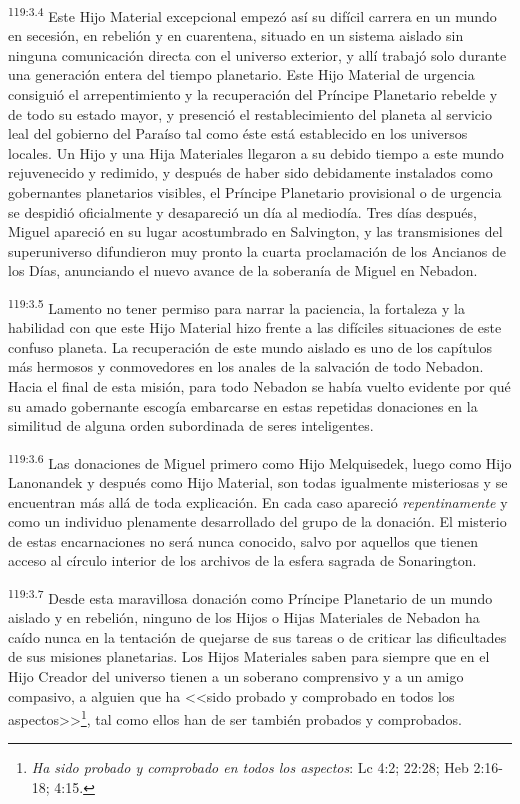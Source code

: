 \par
\textsuperscript{119:3.4} Este Hijo Material excepcional empezó así su difícil carrera en un mundo en secesión, en rebelión y en cuarentena, situado en un sistema aislado sin ninguna comunicación directa con el universo exterior, y allí trabajó solo durante una generación entera del tiempo planetario. Este Hijo Material de urgencia consiguió el arrepentimiento y la recuperación del Príncipe Planetario rebelde y de todo su estado mayor, y presenció el restablecimiento del planeta al servicio leal del gobierno del Paraíso tal como éste está establecido en los universos locales. Un Hijo y una Hija Materiales llegaron a su debido tiempo a este mundo rejuvenecido y redimido, y después de haber sido debidamente instalados como gobernantes planetarios visibles, el Príncipe Planetario provisional o de urgencia se despidió oficialmente y desapareció un día al mediodía. Tres días después, Miguel apareció en su lugar acostumbrado en Salvington, y las transmisiones del superuniverso difundieron muy pronto la cuarta proclamación de los Ancianos de los Días, anunciando el nuevo avance de la soberanía de Miguel en Nebadon.

\par
\textsuperscript{119:3.5} Lamento no tener permiso para narrar la paciencia, la fortaleza y la habilidad con que este Hijo Material hizo frente a las difíciles situaciones de este confuso planeta. La recuperación de este mundo aislado es uno de los capítulos más hermosos y conmovedores en los anales de la salvación de todo Nebadon. Hacia el final de esta misión, para todo Nebadon se había vuelto evidente por qué su amado gobernante escogía embarcarse en estas repetidas donaciones en la similitud de alguna orden subordinada de seres inteligentes.

\par
\textsuperscript{119:3.6} Las donaciones de Miguel primero como Hijo Melquisedek, luego como Hijo Lanonandek y después como Hijo Material, son todas igualmente misteriosas y se encuentran más allá de toda explicación. En cada caso apareció \textit{repentinamente} y como un individuo plenamente desarrollado del grupo de la donación. El misterio de estas encarnaciones no será nunca conocido, salvo por aquellos que tienen acceso al círculo interior de los archivos de la esfera sagrada de Sonarington.

\par
\textsuperscript{119:3.7} Desde esta maravillosa donación como Príncipe Planetario de un mundo aislado y en rebelión, ninguno de los Hijos o Hijas Materiales de Nebadon ha caído nunca en la tentación de quejarse de sus tareas o de criticar las dificultades de sus misiones planetarias. Los Hijos Materiales saben para siempre que en el Hijo Creador del universo tienen a un soberano comprensivo y a un amigo compasivo, a alguien que ha <<sido probado y comprobado en todos los aspectos>>\footnote{\textit{Ha sido probado y comprobado en todos los aspectos}: Lc 4:2; 22:28; Heb 2:16-18; 4:15.}, tal como ellos han de ser también probados y comprobados.


